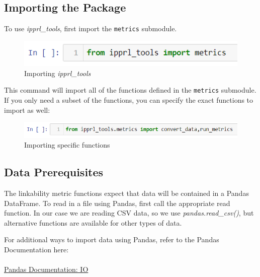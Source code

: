 \documentclass[titlepage, 11pt]{article}
\newcommand{\pkgname}{\textit{ipprl\_tools}}
\begin{document}
\subsection{Importing the Package}
\label{imprt}
To use \pkgname{}, first import the \verb|metrics| submodule. 
\begin{figure}[H]
    \centering
    \includegraphics{imgs/ImportDoc.PNG}
    \caption{Importing \pkgname{}}
    \label{fig:my_label}
\end{figure}

\noindent This command will import all of the functions defined in the \verb|metrics| submodule. If you only need a subset of the functions, you can specify the exact functions to import as well:

\begin{figure}[H]
    \centering
    \includegraphics{imgs/ImportDocFunctions.PNG}
    \caption{Importing specific functions}
    \label{fig:my_label}
\end{figure}

\subsection{Data Prerequisites}
\label{data_prereqs}
The linkability metric functions expect that data will be contained in a Pandas DataFrame. To read in a file using Pandas, first call the appropriate read function. In our case we are reading CSV data, so we use \textit{pandas.read\_csv()}, but alternative functions are available for other types of data.

\noindent For additional ways to import data using Pandas, refer to the Pandas Documentation here:
\\
\\
\href{https://pandas.pydata.org/pandas-docs/stable/user_guide/io.html}{Pandas Documentation: IO}
\\
\end{document}
